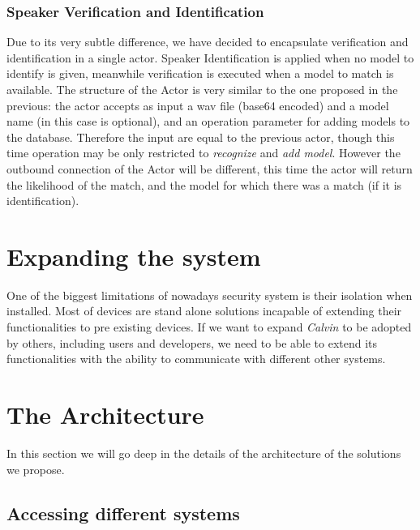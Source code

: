 \subsubsection{Speaker Verification and Identification}

Due to its very subtle difference, we have decided to encapsulate verification
and identification in a single actor. Speaker Identification is applied when no
model to identify is given, meanwhile verification is executed when a model to match
is available. The structure of the Actor is very similar to the one proposed in the
previous: the actor accepts as input a wav file (base64 encoded) and a model name
(in this case is optional), and an operation parameter for adding models to the database.
Therefore the input are equal to the previous actor, though this time operation may
be only restricted to \textit{recognize} and \textit{add model}. However the outbound
connection of the Actor will be different, this time the actor will return the likelihood
of the match, and the model for which there was a match (if it is identification).



\section{Expanding the system}
One of the biggest limitations of nowadays security system is their isolation
when installed. Most of devices are stand alone solutions incapable of extending
their functionalities to pre existing devices. If we want to expand \textit{Calvin} to
be adopted by others, including users and developers, we need to be able to extend its
functionalities with the ability to communicate with different other systems.

\section{The Architecture}

In this section we will go deep in the details of the architecture of the solutions
we propose.

\subsection{Accessing different systems}

